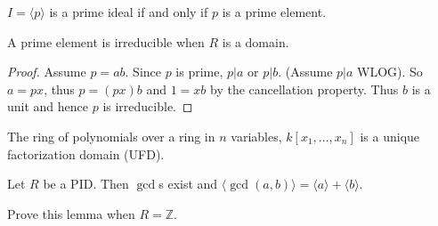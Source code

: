\documentclass{article}
\newenvironment{example}[1][Example.]{
  \begin{trivlist} \item[\hskip \labelsep {\bfseries #1}]
}{\end{trivlist}}
\newenvironment{theorem}[1][Theorem.]{
  \begin{trivlist} \item[\hskip \labelsep {\bfseries #1}]
}{\end{trivlist}}
\newenvironment{exercise}[1][Exercise.]{
  \begin{trivlist} \item[\hskip \labelsep {\bfseries #1}]
}{\end{trivlist}}
\newcommand{\ang}[1]{\langle #1 \rangle}
\begin{document}
\begin{theorem}[Claim.]
  $I = \ang{p}$ is a prime ideal if and only if $p$ is a prime element.
\end{theorem}
\begin{theorem}[Lemma.]
  A prime element is irreducible when $R$ is a domain.
\end{theorem}
\begin{proof}
  Assume $p = ab$. Since $p$ is prime, $p | a$ or $p | b$. (Assume $p | a$ WLOG).
  So $a = px$, thus $p = (px)b$ and $1 = xb$ by the cancellation property. Thus
  $b$ is a unit and hence $p$ is irreducible.
\end{proof}
\begin{example}
  The ring of polynomials over a ring in $n$ variables, $k[x_1, \hdots, x_n]$ is
  a unique factorization domain (UFD).
\end{example}
\begin{theorem}[Lemma.]
  Let $R$ be a PID. Then $\gcd$s exist  and $\ang{\gcd(a, b)} = \ang a + \ang b$.
\end{theorem}
\begin{exercise}
  Prove this lemma when $R = \mathbb Z$.
\end{exercise}
\end{document}
